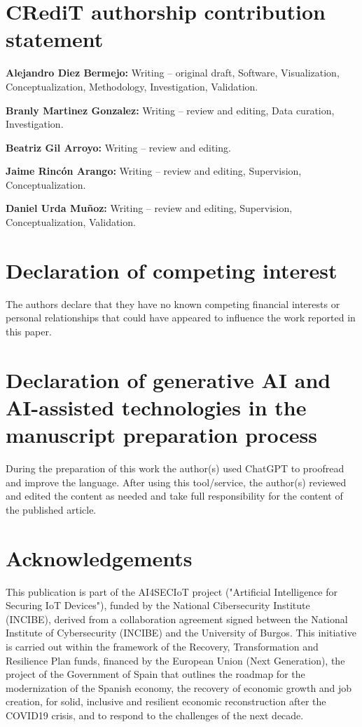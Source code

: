 \section*{CRediT authorship contribution statement}
\label{sec:CRediTAuthorshipContributionStatement}

\textbf{Alejandro Diez Bermejo:} Writing – original draft, Software, Visualization, Conceptualization, Methodology, Investigation, Validation.

\textbf{Branly Martinez Gonzalez:} Writing – review and editing, Data curation, Investigation.

\textbf{Beatriz Gil Arroyo:} Writing – review and editing.

\textbf{Jaime Rincón Arango:} Writing – review and editing, Supervision, Conceptualization.

\textbf{Daniel Urda Muñoz:} Writing – review and editing, Supervision, Conceptualization, Validation.

\section*{Declaration of competing interest}
\label{sec:DeclarationOfCompetingInterest}
The authors declare that they have no known competing financial interests or personal relationships that could have appeared to influence the work reported in this paper.

\section*{Declaration of generative AI and AI-assisted technologies in the manuscript preparation process}
\label{sec:DeclarationGenerativeAI}
During the preparation of this work the author(s) used ChatGPT to proofread and improve the language. After using this tool/service, the author(s) reviewed and edited the content as needed and take full responsibility for the content of the published article.

\section*{Acknowledgements}
\label{sec:Acknowledgements}
This publication is part of the AI4SECIoT project ("Artificial Intelligence for Securing IoT Devices"), funded by the National Cibersecurity Institute (INCIBE), derived from a collaboration agreement signed between the National Institute of Cybersecurity (INCIBE) and the University of Burgos. This initiative is carried out within the framework of the Recovery, Transformation and Resilience Plan funds, financed by the European Union (Next Generation), the project of the Government of Spain that outlines the roadmap for the modernization of the Spanish economy, the recovery of economic growth and job creation, for solid, inclusive and resilient economic reconstruction after the COVID19 crisis, and to respond to the challenges of the next decade.
